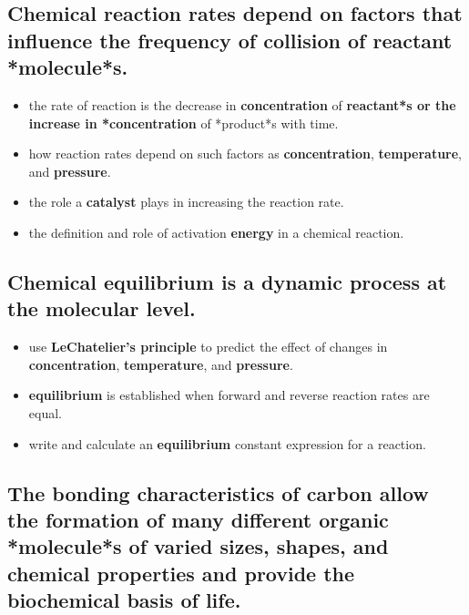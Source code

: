 \documentclass[11pt]{article}
\begin{document}
\subsection{Chemical reaction rates depend on factors that influence the frequency of collision of \textbf{reactant} *molecule*s.}
\label{sec:org80cfafa}

\begin{itemize}
\item the rate of reaction is the decrease in \textbf{concentration} of \textbf{reactant*s or the increase in *concentration} of *product*s with time.
\item how reaction rates depend on such factors as \textbf{concentration}, \textbf{temperature}, and \textbf{pressure}.
\item the role a \textbf{catalyst} plays in increasing the reaction rate.
\item the definition and role of activation \textbf{energy} in a chemical reaction.
\end{itemize}
\subsection{Chemical \textbf{equilibrium} is a dynamic process at the molecular level.}
\label{sec:orgf64e8cc}

\begin{itemize}
\item use \textbf{LeChatelier’s principle} to predict the effect of changes in \textbf{concentration}, \textbf{temperature}, and \textbf{pressure}.
\item \textbf{equilibrium} is established when forward and reverse reaction rates are equal.
\item write and calculate an \textbf{equilibrium} constant expression for a reaction.
\end{itemize}
\subsection{The bonding characteristics of carbon allow the formation of many different organic *molecule*s of varied sizes, shapes, and chemical properties and provide the biochemical basis of life.}
\label{sec:orgcde216e}
\end{document}
